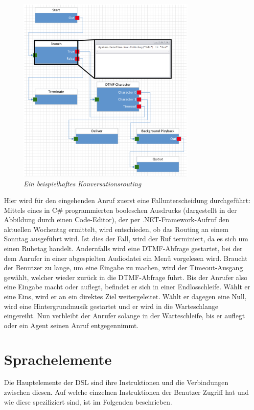 \begin{figure} %
	\centering
		\includegraphics[width=0.79\textwidth]{img/ExampleFlowCodeHighlighted.png}
	\caption[Beispiel für ein Konversationsrouting]{\textit{Ein beispielhaftes Konversationsrouting}}
	\label{fig:ExampleRouting}
\end{figure}
Hier wird für den eingehenden Anruf zuerst eine Fallunterscheidung durchgeführt: Mittels eines in C\# programmierten booleschen Ausdrucks (dargestellt in der Abbildung durch einen Code-Editor), der per .NET-Framework-Aufruf den aktuellen Wochentag ermittelt, wird entschieden, ob das Routing an einem Sonntag ausgeführt wird. Ist dies der Fall, wird der Ruf terminiert, da es sich um einen Ruhetag handelt. Andernfalls wird eine DTMF-Abfrage gestartet, bei der dem Anrufer in einer abgespielten Audiodatei ein Menü vorgelesen wird. Braucht der Benutzer zu lange, um eine Eingabe zu machen, wird der Timeout-Ausgang gewählt, welcher wieder zurück in die DTMF-Abfrage führt. Bis der Anrufer also eine Eingabe macht oder auflegt, befindet er sich in einer Endlosschleife. Wählt er eine Eins, wird er an ein direktes Ziel weitergeleitet. Wählt er dagegen eine Null, wird eine Hintergrundmusik gestartet und er wird in die Warteschlange eingereiht. Nun verbleibt der Anrufer solange in der Warteschleife, bis er auflegt oder ein Agent seinen Anruf entgegennimmt.  

\section{Sprachelemente}
\label{sec:Sprachelemente}
Die Hauptelemente der DSL sind ihre Instruktionen und die Verbindungen zwischen diesen. Auf welche einzelnen Instruktionen der Benutzer Zugriff hat und wie diese spezifiziert sind, ist im Folgenden beschrieben. 

